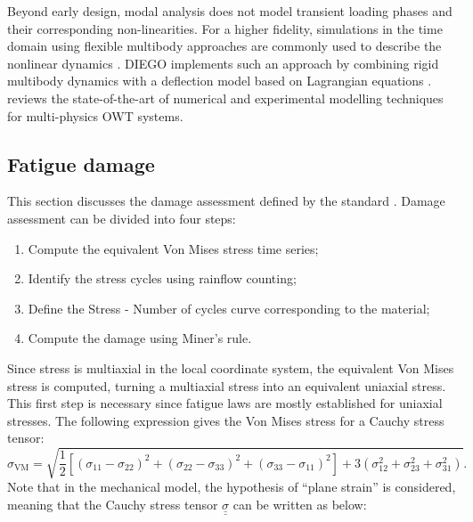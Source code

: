 Beyond early design, modal analysis does not model transient loading phases and their corresponding non-linearities. 
For a higher fidelity, simulations in the time domain using flexible multibody approaches are commonly used to describe the nonlinear dynamics \citep{holm_2009_multibody,alsolihat_2018_flexible_multibody}.
DIEGO implements such an approach by combining rigid multibody dynamics with a deflection model based on Lagrangian equations \citep{milano_thesis_2021}. 
\citet{otter_2022_owt_modeling_review} reviews the state-of-the-art of numerical and experimental modelling techniques for multi-physics OWT systems.

\subsection{Fatigue damage}
This section discusses the damage assessment defined by the standard \cite{dnv_fatigue_2016}. 
Damage assessment can be divided into four steps: 

\begin{enumerate}
    \item Compute the equivalent Von Mises stress time series;
    \item Identify the stress cycles using rainflow counting;
    \item Define the Stress - Number of cycles curve corresponding to the material;
    \item Compute the damage using Miner's rule.
\end{enumerate}

Since stress is multiaxial in the local coordinate system, the equivalent Von Mises stress is computed, turning a multiaxial stress into an equivalent uniaxial stress. 
This first step is necessary since fatigue laws are mostly established for uniaxial stresses. 
The following expression gives the Von Mises stress for a Cauchy stress tensor:
\begin{equation}
    \sigma _{\mathrm{VM}}={\sqrt{{\frac {1}{2}}\left[(\sigma _{11}-\sigma _{22})^{2}+(\sigma _{22}-\sigma _{33})^{2}+(\sigma _{33}-\sigma _{11})^{2}\right]+3\left(\sigma _{12}^{2}+\sigma _{23}^{2}+\sigma _{31}^{2}\right)}}.
\end{equation}
Note that in the mechanical model, the hypothesis of ``plane strain'' is considered, meaning that the Cauchy stress tensor $\underline{\underline{\sigma}}$ can be written as below:

